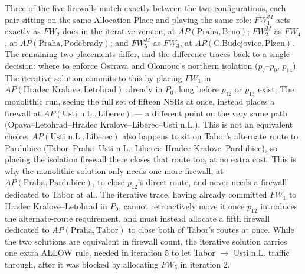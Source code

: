 Three of the five firewalls match exactly between the two configurations, each pair sitting on the same Allocation Place and playing the same role: $\mathit{FW}^{M}_1$ acts exactly as $\mathit{FW}_2$ does in the iterative version, at $\mathit{AP}(\text{Praha},\text{Brno})$; $\mathit{FW}^{M}_2$ as $\mathit{FW}_4$, at $\mathit{AP}(\text{Praha},\text{Podebrady})$; and $\mathit{FW}^{M}_5$ as $\mathit{FW}_3$, at $\mathit{AP}(\text{C.Budejovice},\text{Plzen})$. The remaining two placements differ, and the difference traces back to a single decision: where to enforce Ostrava and Olomouc's northern isolation ($p_7$--$p_9$, $p_{14}$). The iterative solution commits to this by placing $\mathit{FW}_1$ in $\mathit{AP}(\text{Hradec Kralove},\text{Letohrad})$ already in $P_0$, long before $p_{12}$ or $p_{13}$ exist. The monolithic run, seeing the full set of fifteen NSRs at once, instead places a firewall at $\mathit{AP}(\text{Usti n.L.},\text{Liberec})$ — a different point on the very same path (Opava--Letohrad--Hradec Kralove--Liberec--Usti n.L.). This is not an equivalent choice: $\mathit{AP}(\text{Usti n.L.},\text{Liberec})$ also happens to sit on Tabor's alternate route to Pardubice (Tabor--Praha--Usti n.L.--Liberec--Hradec Kralove--Pardubice), so placing the isolation firewall there closes that route too, at no extra cost. This is why the monolithic solution only needs one more firewall, at $\mathit{AP}(\text{Praha},\text{Pardubice})$, to close $p_{12}$'s direct route, and never needs a firewall dedicated to Tabor at all. The iterative trace, having already committed $\mathit{FW}_1$ to Hradec Kralove--Letohrad in $P_0$, cannot retroactively move it once $p_{12}$ introduces the alternate-route requirement, and must instead allocate a fifth firewall dedicated to $\mathit{AP}(\text{Praha},\text{Tabor})$ to close both of Tabor's routes at once. While the two solutions are equivalent in firewall count, the iterative solution carries one extra ALLOW rule, needed in iteration 5 to let Tabor $\to$ Usti n.L. traffic through, after it was blocked by allocating $\mathit{FW}_5$ in iteration 2.


